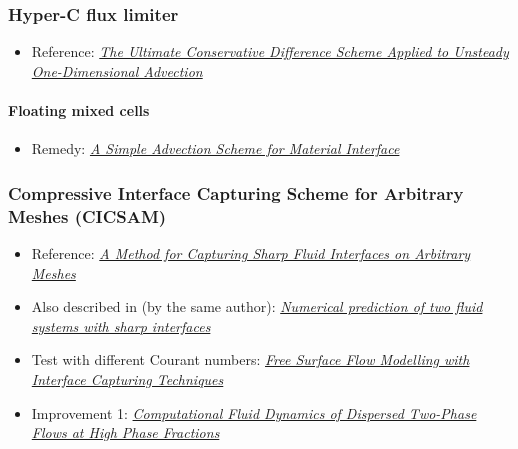 \documentclass[]{report}
\begin{document}
\subsubsection{Hyper-C flux limiter}

\begin{itemize}
    \item Reference: \textit{\href{http://www.water.tkk.fi/wr/kurssit/Yhd-12.112/TVD1.pdf}{The Ultimate Conservative Difference Scheme Applied to Unsteady One-Dimensional Advection}}
\end{itemize}

\paragraph{Floating mixed cells}

\begin{itemize}
    \item Remedy: \textit{\href{https://e-reports-ext.llnl.gov/pdf/245038.pdf}{A Simple Advection Scheme for Material Interface}}
\end{itemize}

\subsubsection{Compressive Interface Capturing Scheme for Arbitrary Meshes (CICSAM)}

\begin{itemize}
    \item Reference: \textit{\href{http://ac.els-cdn.com/S0021999199962769/1-s2.0-S0021999199962769-main.pdf?_tid=85161b57da5f4401e55c9d07495e24ea&acdnat=1336167249_a59e4f578adbacf3bff69936c48cdd57}{A Method for Capturing Sharp Fluid Interfaces on Arbitrary Meshes}}
    \item Also described in (by the same author): \textit{\href{http://powerlab.fsb.hr/ped/kturbo/OpenFOAM/docs/OnnoUbbinkPhD.pdf}{Numerical prediction of two fluid systems with sharp interfaces}}
    \item Test with different Courant numbers: \textit{\href{http://www.marin.nl/upload_mm/8/2/c/1807524470_1999999096_2007-ECCOMAS_HoekstraVazAbeilBunnik.pdf}{Free Surface Flow Modelling with Interface Capturing Techniques}}
    \item Improvement 1: \textit{\href{http://powerlab.fsb.hr/ped/kturbo/openfoam/docs/HenrikRuschePhD2002.pdf}{Computational Fluid Dynamics of Dispersed Two-Phase Flows at High Phase Fractions}}
\end{itemize}
\end{document}
